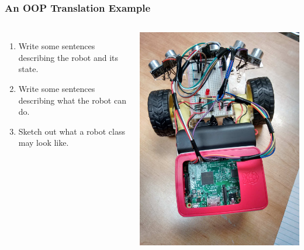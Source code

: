 \documentclass[handout]{beamer}
\begin{document}
\begin{frame}
   \frametitle{An OOP Translation Example}
   \begin{columns}
   \begin{enumerate}
   \item Write some sentences describing the robot and its state.
   \item Write some sentences describing what the robot can do.
   \item Sketch out what a robot class may look like.
   \end{enumerate}
   
   \includegraphics[width=\textwidth]{images/robot-top}
   \end{columns}
\end{frame}
\end{document}
